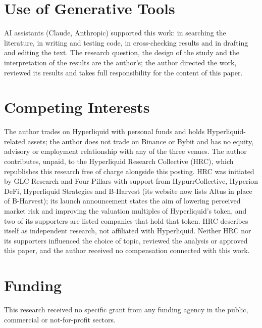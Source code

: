 \documentclass[10pt,a4paper]{article}
\begin{document}
\section*{Use of Generative Tools}

AI assistants (Claude, Anthropic) supported this work: in searching the literature, in writing and testing code, in cross-checking results and in drafting and editing the text. The research question, the design of the study and the interpretation of the results are the author's; the author directed the work, reviewed its results and takes full responsibility for the content of this paper.

\section*{Competing Interests}

The author trades on Hyperliquid with personal funds and holds Hyperliquid-related assets; the author does not trade on Binance or Bybit and has no equity, advisory or employment relationship with any of the three venues. The author contributes, unpaid, to the Hyperliquid Research Collective (HRC), which republishes this research free of charge alongside this posting. HRC was initiated by GLC Research and Four Pillars with support from HypurrCollective, Hyperion DeFi, Hyperliquid Strategies and B-Harvest (its website now lists Altus in place of B-Harvest); its launch announcement states the aim of lowering perceived market risk and improving the valuation multiples of Hyperliquid's token, and two of its supporters are listed companies that hold that token. HRC describes itself as independent research, not affiliated with Hyperliquid. Neither HRC nor its supporters influenced the choice of topic, reviewed the analysis or approved this paper, and the author received no compensation connected with this work.

\section*{Funding}

This research received no specific grant from any funding agency in the public, commercial or not-for-profit sectors.
\end{document}
